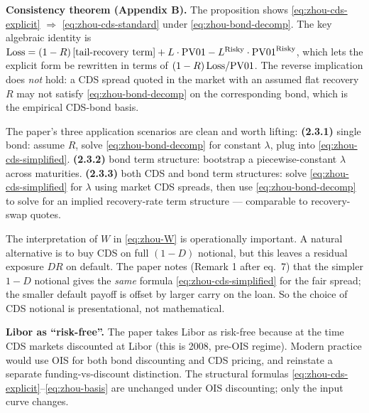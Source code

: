 \documentclass[11pt,a4paper]{article}
\begin{document}
\begin{commentary}
\textbf{Consistency theorem (Appendix B).} The proposition shows
\eqref{eq:zhou-cds-explicit} $\Rightarrow$ \eqref{eq:zhou-cds-standard}
under \eqref{eq:zhou-bond-decomp}. The key algebraic identity is
$\mathrm{Loss} = (1 - R)\, [\text{tail-recovery term}] + L \cdot \mathrm{PV01} - L^{\text{Risky}} \cdot \mathrm{PV01}^{\text{Risky}}$,
which lets the explicit form be rewritten in terms of $(1 - R)\, \mathrm{Loss} / \mathrm{PV01}$.
The reverse implication does \emph{not} hold: a CDS spread quoted in
the market with an assumed flat recovery $R$ may not satisfy
\eqref{eq:zhou-bond-decomp} on the corresponding bond, which is the
empirical CDS-bond basis.
\end{commentary}

\begin{commentary}
The paper's three application scenarios are clean and worth lifting:
\textbf{(2.3.1)} single bond: assume $R$, solve \eqref{eq:zhou-bond-decomp}
for constant $\lambda$, plug into \eqref{eq:zhou-cds-simplified}.
\textbf{(2.3.2)} bond term structure: bootstrap a piecewise-constant
$\lambda$ across maturities. \textbf{(2.3.3)} both CDS and bond term
structures: solve \eqref{eq:zhou-cds-simplified} for $\lambda$ using
market CDS spreads, then use \eqref{eq:zhou-bond-decomp} to solve
for an implied recovery-rate term structure --- comparable to
recovery-swap quotes.
\end{commentary}

\begin{commentary}
The interpretation of $W$ in \eqref{eq:zhou-W} is operationally
important. A natural alternative is to buy CDS on full $(1-D)$
notional, but this leaves a residual exposure $DR$ on default. The
paper notes (Remark 1 after eq.~7) that the simpler $1-D$ notional
gives the \emph{same} formula \eqref{eq:zhou-cds-simplified} for the
fair spread; the smaller default payoff is offset by larger carry on
the loan. So the choice of CDS notional is presentational, not
mathematical.
\end{commentary}

\begin{commentary}
\textbf{Libor as ``risk-free''.} The paper takes Libor as risk-free
because at the time CDS markets discounted at Libor (this is 2008,
pre-OIS regime). Modern practice would use OIS for both bond
discounting and CDS pricing, and reinstate a separate
funding-vs-discount distinction. The structural formulas
\eqref{eq:zhou-cds-explicit}--\eqref{eq:zhou-basis} are unchanged
under OIS discounting; only the input curve changes.
\end{commentary}
\end{document}
